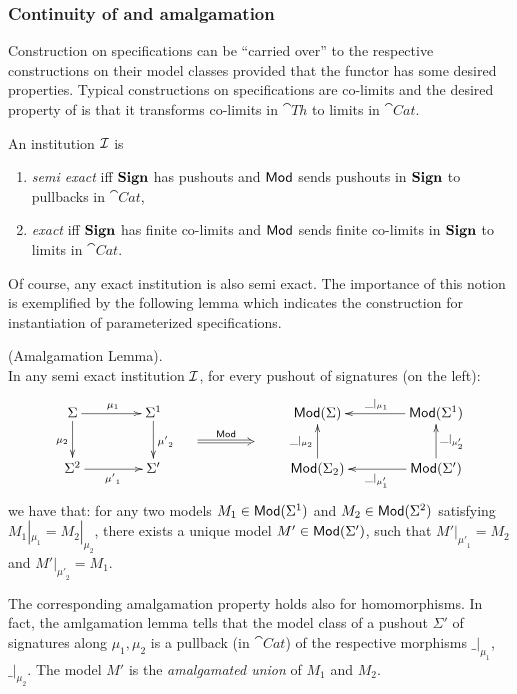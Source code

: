 \subsubsection{Continuity of  and amalgamation}
Construction on specifications can be ``carried over'' to the respective
constructions on their model classes provided that the  functor has
some desired properties. Typical constructions on specifications are co-limits
and the desired property of  is that it transforms co-limits in
$\cat{Th}$ to limits in $\cat{Cat}$.

\begin{definition} An institution ${\mathcal{I}}$ is 
\begin{enumerate}
\item {\em semi exact} iff ${\bf Sign}$
has pushouts and ${\sf {Mod}}$ sends pushouts in ${\bf Sign}$ to pullbacks in
$\cat{Cat}$,
\item {\em exact} iff ${\bf Sign}$ has finite co-limits and ${\sf {Mod}}$ sends
finite co-limits in ${\bf Sign}$ to limits in $\cat{Cat}$.
\end{enumerate}
\end{definition}
Of course, any exact institution is also semi exact. The importance of this
notion is exemplified by the following lemma which indicates the construction
for instantiation of parameterized specifications.
%
%
%
\begin{lemma}(Amalgamation Lemma).\\
In any semi exact institution ${\mathcal{I}}$, for every pushout of
signatures (on the left):
\[\xymatrix@R=0.3cm@C=0.6cm{
\Sigma \ar[dd]_{\mu_{2}} \ar[rr]^{\mu_1} && {\Sigma^1} \ar[dd]^{{\mu'}_2}  &&&& 
  \Mod(\Sigma) && \Mod(\Sigma^1) \ar[ll]_{\_|_{\mu_{1}}}  \\
&&  &\ar@{=>}[rr]^{\Mod} &&&\\
{\Sigma^2} \ar[rr]_{{\mu'}_1}	&& {\Sigma'} &&&&
   \Mod(\Sigma_2) \ar[uu]^{\_|_{\mu_{2}}} && \Mod(\Sigma')
   \ar[uu]_{\_|_{\mu'_{2}}} \ar[ll]^{\_|_{\mu'_{1}}}  
}
\]
we have that: for any two models $M_1 \in {\sf {Mod}}({\Sigma^1})$ and $M_2 \in
{\sf {Mod}}({\Sigma^2})$ satisfying $M_1|_{{\mu}_1} = M_2|_{{\mu}_2}$, there exists 
a unique model $M' \in {\sf {Mod}}({\Sigma'})$, such that $M'|_{{\mu'}_1} = M_2$ and
$M'|_{{\mu'}_2} = M_1$.
\end{lemma}
%
The corresponding amalgamation property holds also for homomorphisms. 
In fact, the amlgamation lemma tells that the model class of a
pushout $\Sigma'$ of signatures along $\mu_1,\mu_2$ is a pullback (in $\cat{Cat}$) of the respective
morphisms $\_|_{\mu_{1}}$, $\_|_{\mu_{2}}$. The model $M'$ is the {\em
amalgamated union} of $M_1$ and $M_2$. 

